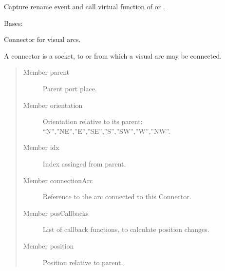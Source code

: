 \documentclass[a4paper,10pt,english]{sphinxmanual}
\begin{document}
\begin{fulllineitems}
\begin{fulllineitems}
\end{fulllineitems}


\begin{fulllineitems}
\label{model_link:model.AbstractItem.AbstractItem.renameElement}
Capture rename event and call virtual function of  or .

\end{fulllineitems}


\end{fulllineitems}


\begin{fulllineitems}
\label{model_link:model.AbstractItem.Connector}
Bases: 

Connector for visual arcs.

A connector is a socket, to or from which a visual arc may be connected.
\begin{quote}\begin{description}
\item[{Member parent}] \leavevmode
Parent port place.

\item[{Member orientation}] \leavevmode
Orientation relative to its parent: ``N'',''NE'',''E'',''SE'',''S'',''SW'',''W'',''NW''.

\item[{Member idx}] \leavevmode
Index assinged from parent.

\item[{Member connectionArc}] \leavevmode
Reference to the arc connected to this Connector.

\item[{Member posCallbacks}] \leavevmode
List of callback functions, to calculate position changes.

\item[{Member position}] \leavevmode
Position relative to parent.

\end{description}\end{quote}


\end{fulllineitems}
\end{document}
